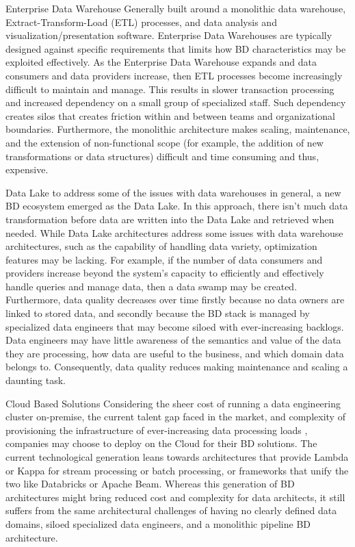 \documentclass[conference]{IEEEtran}
\begin{document}
\begin{LaTeXdescription}
    \item[Enterprise Data Warehouse] Generally built around a monolithic data warehouse, Extract-Transform-Load (ETL) processes, and data analysis and visualization/presentation software. Enterprise Data Warehouses are typically designed against specific requirements that limits how BD characteristics may be exploited effectively. As the Enterprise Data Warehouse expands and data consumers and data providers increase, then ETL processes become increasingly difficult to maintain and manage. This results in slower transaction processing and increased dependency on a small group of specialized staff. Such dependency creates silos that creates friction within and between teams and organizational boundaries. Furthermore, the monolithic architecture makes scaling, maintenance, and the extension of non-functional scope (for example, the addition of new transformations or data structures)  difficult and time consuming and thus, expensive.
    \item[Data Lake] to address some of the issues with data warehouses in general, a new BD ecosystem emerged as the Data Lake. In this approach, there isn't much data transformation before data are written into the Data Lake and retrieved when needed. While Data Lake architectures address some issues with data warehouse architectures, such as the capability of handling data variety, optimization features may be lacking. For example, if the number of data consumers and providers increase beyond the system's capacity to efficiently and effectively handle queries and manage data, then a data swamp may be created. Furthermore, data quality decreases over time firstly because no data owners are linked to stored data, and secondly because the BD stack is managed by specialized data engineers that may become siloed with ever-increasing backlogs. Data engineers may have little awareness of the semantics and value of the data they are processing, how data are useful to the business, and which domain data belongs to. Consequently, data quality reduces making maintenance and scaling a daunting task. 
    \item[Cloud Based Solutions] Considering the sheer cost of running a data engineering cluster on-premise, the current talent gap faced in the market, and complexity of provisioning the infrastructure of ever-increasing data processing loads \cite{AtaeiHype}, companies may choose to deploy on the Cloud for their BD solutions. The current technological generation leans towards architectures that provide Lambda or Kappa for stream processing or batch processing, or frameworks that unify the two like Databricks or Apache Beam. Whereas this generation of BD architectures might bring reduced cost and complexity for data architects, it still suffers from the same architectural challenges of having no clearly defined data domains, siloed specialized data engineers, and a monolithic pipeline BD architecture.
\end{LaTeXdescription}
\end{document}
